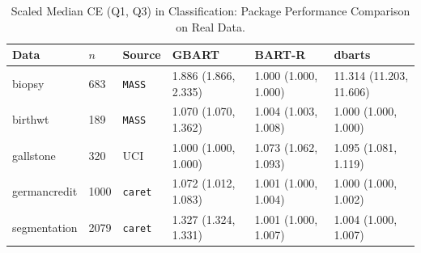 \documentclass[12pt]{article}
\newcommand{\1}{\mathbb{I}}
\theoremstyle{plain}
\theoremstyle{definition}
\theoremstyle{remark}
\begin{document}
\begin{table}
\centering
\caption{Scaled Median CE (Q1, Q3) in Classification: Package Performance Comparison on Real Data.}
\label{tab:classification_datasets}
\begin{tabular}{@{}llllll@{}}
\toprule
Data        & $n$  & Source & GBART                & BART-R               & dbarts                 \\ \midrule
biopsy       & 683  & \texttt{MASS}   & 1.886 (1.866, 2.335) & 1.000 (1.000, 1.000) & 11.314 (11.203, 11.606) \\
birthwt      & 189  & \texttt{MASS}   & 1.070 (1.070, 1.362) & 1.004 (1.003, 1.008) & 1.000 (1.000, 1.000)   \\
gallstone    & 320    & UCI    & 1.000 (1.000, 1.000) & 1.073 (1.062, 1.093) & 1.095 (1.081, 1.119)   \\
germancredit & 1000 & \texttt{caret}  & 1.072 (1.012, 1.083) & 1.001 (1.000, 1.004) & 1.000 (1.000, 1.002)   \\
segmentation & 2079 & \texttt{caret}  & 1.327 (1.324, 1.331) & 1.001 (1.000, 1.007) & 1.004 (1.000, 1.007)   \\ \bottomrule
\end{tabular}
\end{table}
\end{document}
